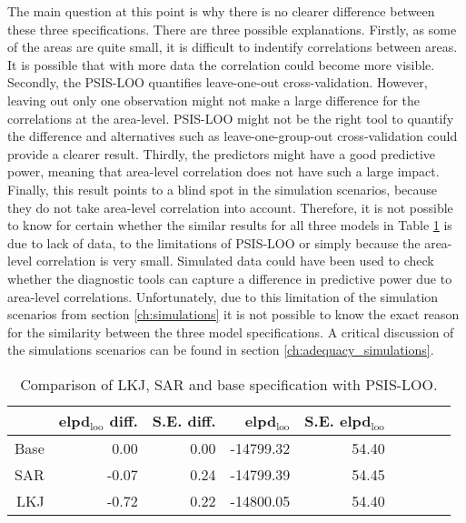 The main question at this point is why there is no clearer difference between these three specifications.
There are three possible explanations.
Firstly, as some of the areas are quite small, it is difficult to indentify correlations between areas.
It is possible that with more data the correlation could become more visible.
Secondly, the PSIS-LOO quantifies leave-one-out cross-validation.
However, leaving out only one observation might not make a large difference for the correlations at the area-level.
PSIS-LOO might not be the right tool to quantify the difference and alternatives such as leave-one-group-out cross-validation could provide a clearer result.
Thirdly, the predictors might have a good predictive power, meaning that area-level correlation does not have such a large impact.
Finally, this result points to a blind spot in the simulation scenarios, because they do not take area-level correlation into account.
Therefore, it is not possible to know for certain whether the similar results for all three models in Table \ref{tab:lkj_sar_base} is due to lack of data, to the limitations of PSIS-LOO or simply because the area-level correlation is very small.
Simulated data could have been used to check whether the diagnostic tools can capture a difference in predictive power due to area-level correlations.
Unfortunately, due to this limitation of the simulation scenarios from section \ref{ch:simulations} it is not possible to know the exact reason for the similarity between the three model specifications.
A critical discussion of the simulations scenarios can be found in section \ref{ch:adequacy_simulations}.

\begin{table}[ht]
    \centering
    \caption{Comparison of LKJ, SAR and base specification with PSIS-LOO.}
    \begin{tabular}{rrrrrrrrr}
        \hline
        & elpd$_{\text{loo}}$ diff. & S.E. diff. & elpd$_{\text{loo}}$ & S.E. elpd$_{\text{loo}}$  \\
        \hline
        Base & 0.00 & 0.00 & -14799.32 & 54.40  \\
        SAR & -0.07 & 0.24 & -14799.39 & 54.45  \\
        LKJ & -0.72 & 0.22 & -14800.05 & 54.40  \\
        \hline
    \end{tabular}

    \label{tab:lkj_sar_base}
\end{table}



